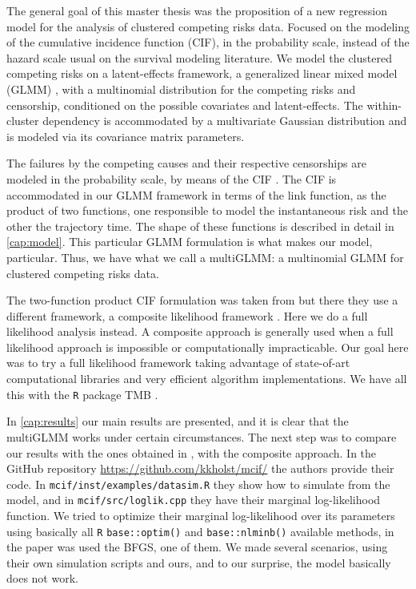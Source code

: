The general goal of this master thesis was the proposition of a new
regression model for the analysis of clustered competing risks
data. Focused on the modeling of the cumulative incidence function
(CIF), in the probability scale, instead of the hazard scale usual on
the survival modeling literature. We model the clustered competing risks
on a latent-effects framework, a generalized linear mixed model (GLMM)
\cite{GLMM}, with a multinomial distribution for the competing risks and
censorship, conditioned on the possible covariates and
latent-effects. The within-cluster dependency is accommodated by a
multivariate Gaussian distribution and is modeled via its covariance
matrix parameters.

The failures by the competing causes and their respective censorships
are modeled in the probability scale, by means of the CIF
\cite{kalb&prentice, andersen12}. The CIF is accommodated in our GLMM
framework in terms of the link function, as the product of two
functions, one responsible to model the instantaneous risk and the other
the trajectory time. The shape of these functions is described in detail
in \autoref{cap:model}. This particular GLMM formulation is what makes
our model, particular. Thus, we have what we call a multiGLMM: a
multinomial GLMM for clustered competing risks data.

The two-function product CIF formulation was taken from
 but there they use a different framework, a
composite likelihood framework \cite{lindsay88, cox&reid04, varin11}.
Here we do a full likelihood analysis instead. A composite approach is
generally used when a full likelihood approach is impossible or
computationally impracticable. Our goal here was to try a full
likelihood framework taking advantage of state-of-art computational
libraries and very efficient algorithm implementations. We have all this
with the \texttt{R} \cite{R21} package TMB \cite{TMB}.

In \autoref{cap:results} our main results are presented, and it is clear
that the multiGLMM works under certain circumstances. The next step was
to compare our results with the ones obtained in ,
with the composite approach. In the GitHub repository
\url{https://github.com/kkholst/mcif/} the authors provide their code.
In \texttt{mcif/inst/examples/datasim.R} they show how to simulate from
the model, and in \texttt{mcif/src/loglik.cpp} they have their marginal
log-likelihood function. We tried to optimize their marginal
log-likelihood over its parameters using basically all \texttt{R}
\texttt{base::optim()} and \texttt{base::nlminb()} available methods, in
the paper was used the BFGS, one of them. We made several scenarios,
using their own simulation scripts and ours, and to our surprise, the
model basically does not work.

